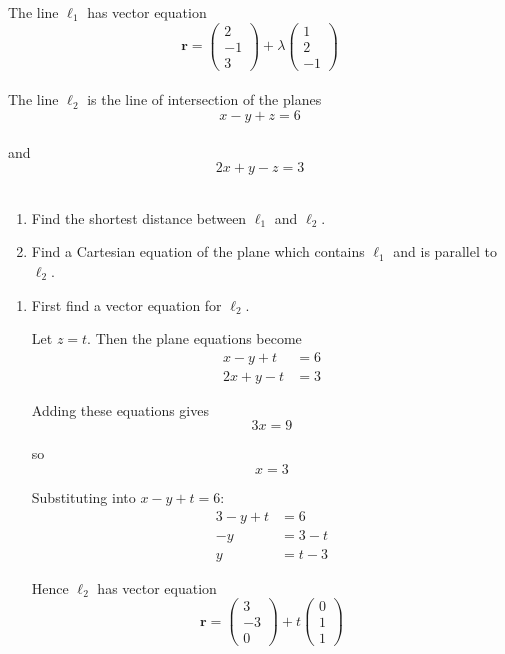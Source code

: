 \documentclass[leqno]{article}
\begin{document}
\begin{enumerate}[
  label=\textbf{\arabic*.},
  leftmargin=*,
  topsep=0pt,
  partopsep=0pt,
  parsep=0pt
]
The line $\ell_1$ has vector equation
\[
\mathbf{r}=\begin{pmatrix}2\\-1\\3\end{pmatrix}+\lambda\begin{pmatrix}1\\2\\-1\end{pmatrix}
\] \\
The line $\ell_2$ is the line of intersection of the planes
\[
x-y+z=6
\] \\
and
\[
2x+y-z=3
\] \\
\begin{enumerate}[label=\textbf{(\roman*)}]
  \item Find the shortest distance between $\ell_1$ and $\ell_2$.  \\
  \item Find a Cartesian equation of the plane which contains $\ell_1$ and is parallel to $\ell_2$.  \\
\end{enumerate}

\vspace*{10pt}

\begin{djsSolution}
\begin{enumerate}[label=\textbf{(\roman*)}]
  \item First find a vector equation for \(\ell_2\).

  Let \(z=t\). Then the plane equations become
  \begin{align*}
  x-y+t&=6\\
  2x+y-t&=3
  \end{align*}

  Adding these equations gives
  \[
  3x=9
  \]

  so
  \[
  x=3
  \]

  Substituting into \(x-y+t=6\):
  \begin{align*}
  3-y+t&=6\\
  -y&=3-t\\
  y&=t-3
  \end{align*}

  Hence \(\ell_2\) has vector equation
  \[
  \mathbf r=\begin{pmatrix}3\\-3\\0\end{pmatrix}+t\begin{pmatrix}0\\1\\1\end{pmatrix}
  \]


\end{enumerate}
\end{djsSolution}
\end{enumerate}
\end{document}
